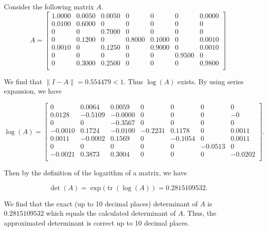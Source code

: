 \begin{example}
Consider the following matrix $A$.
\[
A = \begin{bmatrix}
    1.0000 & 0.0050 & 0.0050 & 0 & 0 & 0 & 0.0000 \\
    0.0100 & 0.6000 & 0 & 0 & 0 & 0 & 0 \\
    0 & 0 & 0.7000 & 0 & 0 & 0 & 0 \\
    0 & 0.1200 & 0 & 0.8000 & 0.1000 & 0 & 0.0010 \\
    0.0010 & 0 & 0.1250 & 0 & 0.9000 & 0 & 0.0010 \\
    0 & 0 & 0 & 0 & 0 & 0.9500 & 0 \\
    0 & 0.3000 & 0.2500 & 0 & 0 & 0 & 0.9800 \\
\end{bmatrix}
\]

We find that $\|I-A\|=0.554479<1$. Thus $\log(A)$ exists.  By using series expansion, we have

\[ \log(A)=
\begin{bmatrix}
    0 & 0.0064 & 0.0059 & 0 & 0 & 0 & 0 \\
    0.0128 & -0.5109 & -0.0000 & 0 & 0 & 0 & -0 \\
    0 & 0 & -0.3567 & 0 & 0 & 0 & 0 \\
   -0.0010 & 0.1724 & -0.0100 & -0.2231 & 0.1178 & 0 & 0.0011 \\
    0.0011 & -0.0002 & 0.1569 & 0 & -0.1054 & 0 & 0.0011 \\
    0 & 0 & 0 & 0 & 0 & -0.0513 & 0 \\
   -0.0021 & 0.3873 & 0.3004 & 0 & 0 & 0 & -0.0202 \\
\end{bmatrix}.
\]

Then by the definition of the logarithm of a matrix, we have

\[
   \det(A)=\exp(\operatorname{tr}(\log(A)) =0.2815109532.
\]

We find that the exact (up to 10 decimal places) determinant of $A$ is \(0.2815109532\) which equals the calculated determinant of $A$. Thus, the approximated determinant is correct up to 10 decimal places. 
\end{example}

